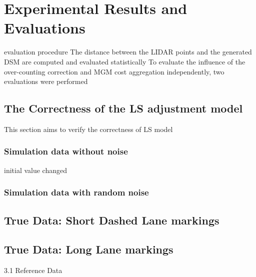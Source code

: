 
\chapter{Experimental Results and Evaluations}
\label{chap:k3}

evaluation procedure
The distance between the LIDAR points and the generated DSM are computed and evaluated statistically
To evaluate the influence of the over-counting correction and MGM
cost aggregation independently, two evaluations were performed






\section{The Correctness of the LS adjustment model}

This section aims to verify the correctness of LS model

\subsection{Simulation data without noise}
initial value changed

\subsection{Simulation data with random noise}




\section{True Data: Short Dashed Lane markings}



\section{True Data: Long Lane markings}


3.1  Reference Data




